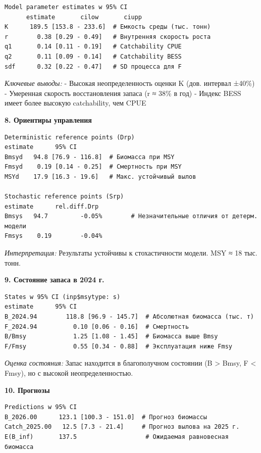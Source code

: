 \documentclass[
  letterpaper,
  DIV=11,
  numbers=noendperiod]{scrreprt}
\begin{document}
\begin{verbatim}
Model parameter estimates w 95% CI
      estimate       cilow       ciupp  
K      189.5 [153.8 - 233.6]  # Емкость среды (тыс. тонн)  
r        0.38 [0.29 - 0.49]   # Внутренняя скорость роста 
q1       0.14 [0.11 - 0.19]   # Catchability CPUE 
q2       0.11 [0.09 - 0.14]   # Catchability BESS  
sdf      0.32 [0.22 - 0.47]   # SD процесса для F
\end{verbatim}

\emph{Ключевые выводы:} - Высокая неопределенность оценки K (дов.
интервал ±40\%) - Умеренная скорость восстановления запаса (r ≈ 38\% в
год) - Индекс BESS имеет более высокую catchability, чем CPUE

\textbf{8. Ориентиры управления}

\begin{verbatim}
Deterministic reference points (Drp)
estimate      95% CI  
Bmsyd   94.8 [76.9 - 116.8]  # Биомасса при MSY  
Fmsyd    0.19 [0.14 - 0.25]  # Смертность при MSY  
MSYd    17.9 [16.3 - 19.6]   # Макс. устойчивый вылов  

Stochastic reference points (Srp)          
estimate      rel.diff.Drp    
Bmsys   94.7         -0.05%        # Незначительные отличия от детерм. модели  
Fmsys    0.19        -0.04%
\end{verbatim}

\emph{Интерпретация:} Результаты устойчивы к стохастичности модели. MSY
≈ 18 тыс. тонн.

\textbf{9. Состояние запаса в 2024 г.}

\begin{verbatim}
States w 95% CI (inp$msytype: s)                   
estimate      95% CI  
B_2024.94        118.8 [96.9 - 145.7]  # Абсолютная биомасса (тыс. т) 
F_2024.94          0.10 [0.06 - 0.16]  # Смертность 
B/Bmsy             1.25 [1.08 - 1.45]  # Биомасса выше Bmsy
F/Fmsy             0.55 [0.34 - 0.88]  # Эксплуатация ниже Fmsy
\end{verbatim}

\emph{Оценка состояния:} Запас находится в благополучном состоянии (B
\textgreater{} Bmsy, F \textless{} Fmsy), но с высокой
неопределенностью.

\textbf{10. Прогнозы}

\begin{verbatim}
Predictions w 95% CI
B_2026.00      123.1 [100.3 - 151.0]  # Прогноз биомассы
Catch_2025.00   12.5 [7.3 - 21.4]     # Прогноз вылова на 2025 г.  
E(B_inf)       137.5                   # Ожидаемая равновесная биомасса
\end{verbatim}
\end{document}

